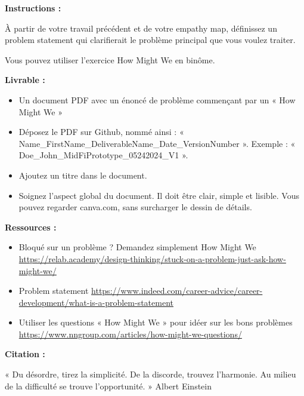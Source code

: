 \makeheaderfiles

\textbf{Instructions :}

À partir de votre travail précédent et de votre empathy map, définissez un problem statement qui clarifierait le problème principal que vous voulez traiter.

Vous pouvez utiliser l'exercice How Might We en binôme.

\textbf{Livrable :}

\begin{itemize}
\item Un document PDF avec un énoncé de problème commençant par un « How Might We »
\item Déposez le PDF sur Github, nommé ainsi : « Name\_FirstName\_DeliverableName\_Date\_VersionNumber ». Exemple : « Doe\_John\_MidFiPrototype\_05242024\_V1 ».
\item Ajoutez un titre dans le document.
\item Soignez l'aspect global du document. Il doit être clair, simple et lisible. Vous pouvez regarder canva.com, sans surcharger le dessin de détails.
\end{itemize}

\textbf{Ressources :}

\begin{itemize}
\item Bloqué sur un problème ? Demandez simplement How Might We \url{https://relab.academy/design-thinking/stuck-on-a-problem-just-ask-how-might-we/}
\item Problem statement \url{https://www.indeed.com/career-advice/career-development/what-is-a-problem-statement}
\item Utiliser les questions « How Might We » pour idéer sur les bons problèmes \url{https://www.nngroup.com/articles/how-might-we-questions/}
\end{itemize}

\textbf{Citation :}

« Du désordre, tirez la simplicité. De la discorde, trouvez l'harmonie. Au milieu de la difficulté se trouve l'opportunité. » Albert Einstein

